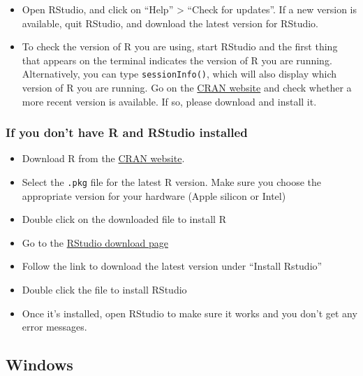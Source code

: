 \documentclass[
]{book}
\providecommand{\tightlist}{%
  \setlength{\itemsep}{0pt}\setlength{\parskip}{0pt}}
\begin{document}
\begin{itemize}
\tightlist
\item
  Open RStudio, and click on ``Help'' \textgreater{} ``Check for updates''. If a new version is
  available, quit RStudio, and download the latest version for RStudio.
\item
  To check the version of R you are using, start RStudio and the first thing
  that appears on the terminal indicates the version of R you are running. Alternatively, you can type \texttt{sessionInfo()}, which will also display which version of R you are running. Go on
  the \href{https://cran.r-project.org/bin/macosx/}{CRAN website} and check
  whether a more recent version is available. If so, please download and install
  it.
\end{itemize}

\hypertarget{if-you-dont-have-r-and-rstudio-installed}{%
\subsubsection*{If you don't have R and RStudio installed}\label{if-you-dont-have-r-and-rstudio-installed}}

\begin{itemize}
\tightlist
\item
  Download R from
  the \href{http://cran.r-project.org/bin/macosx}{CRAN website}.
\item
  Select the \texttt{.pkg} file for the latest R version. Make sure you choose the appropriate version for your hardware (Apple silicon or Intel)
\item
  Double click on the downloaded file to install R
\item
  Go to the \href{https://posit.co/download/rstudio-desktop/}{RStudio download page}
\item
  Follow the link to download the latest version under ``Install Rstudio''
\item
  Double click the file to install RStudio
\item
  Once it's installed, open RStudio to make sure it works and you don't get any
  error messages.
\end{itemize}

\hypertarget{windows}{%
\subsection*{Windows}\label{windows}}
\end{document}
